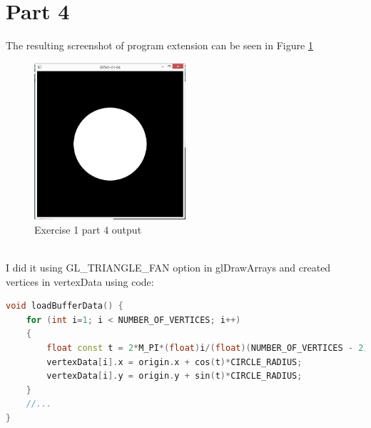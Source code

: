 \section{Part 4}
The resulting screenshot of program extension can be seen in Figure \ref{fig:exercise_1_part_4} \\
\begin{figure}[ht!]
	\begin{center}
		\includegraphics[width=0.5\textwidth]{figures/exercise_1_part_4}
	\end{center}
	\caption{Exercise 1 part 4 output}
	\label{fig:exercise_1_part_4} 
\end{figure} \\
I did it using GL\_TRIANGLE\_FAN option in glDrawArrays and created vertices in vertexData using code:
\begin{lstlisting}[language=cpp, caption={Exercise 1 part 4 creating circle vertices}]
void loadBufferData() {
	for (int i=1; i < NUMBER_OF_VERTICES; i++)
	{
		float const t = 2*M_PI*(float)i/(float)(NUMBER_OF_VERTICES - 2);
		vertexData[i].x = origin.x + cos(t)*CIRCLE_RADIUS;
		vertexData[i].y = origin.y + sin(t)*CIRCLE_RADIUS; 
	}
	//...
}
\end{lstlisting}
\clearpage
